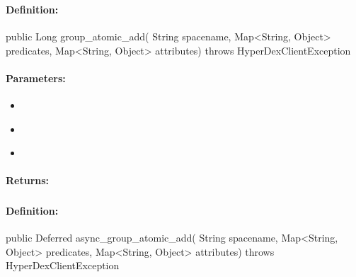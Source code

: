 \subsubsection{}
\label{api:java:group_atomic_add}


\paragraph{Definition:}
\begin{javacode}
public Long group_atomic_add(
        String spacename,
        Map<String, Object> predicates,
        Map<String, Object> attributes) throws HyperDexClientException
\end{javacode}

\paragraph{Parameters:}
\begin{itemize}[noitemsep]
\item {}\\

\item {}\\

\item {}\\

\end{itemize}

\paragraph{Returns:}


\pagebreak
\subsubsection{}
\label{api:java:async_group_atomic_add}


\paragraph{Definition:}
\begin{javacode}
public Deferred async_group_atomic_add(
        String spacename,
        Map<String, Object> predicates,
        Map<String, Object> attributes) throws HyperDexClientException
\end{javacode}

